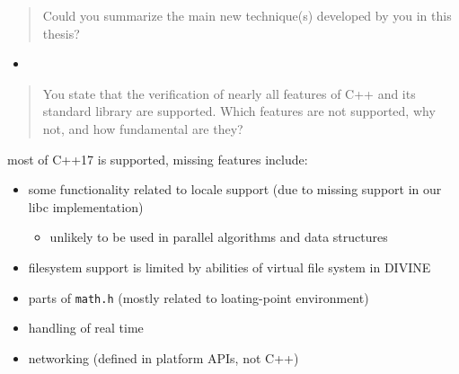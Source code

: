\documentclass[aspectratio=169, fi]{paradise-slide}
\newcommand{\rquote}[1]{\begin{quote}#1\end{quote}\bigskip\setlength{\leftmargini}{1em}}
\begin{document}
\begin{frame}{\qtitle}
  \rquote{Could you summarize the main new technique(s) developed by you in this thesis?}
  \begin{itemize}
    \item 
  \end{itemize}
\end{frame}

\begin{frame}{\qtitle}
  \rquote{You state that the verification of nearly all features of C++ and its standard library are
    supported. Which features are not supported, why not, and how fundamental are they?}

  most of C++17 is supported, missing features include:
  \begin{itemize}
    \item some functionality related to locale support (due to missing support in our libc
      implementation)
      \begin{itemize}
        \item unlikely to be used in parallel algorithms and data structures
      \end{itemize}
    \item filesystem support is limited by abilities of virtual file system in DIVINE
    \item parts of \texttt{math.h} (mostly related to loating-point environment)
    \item handling of real time
    \item networking (defined in platform APIs, not C++)
  \end{itemize}
\end{frame}
\end{document}
